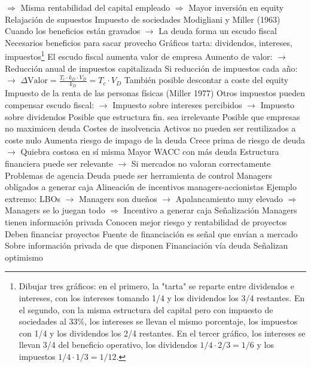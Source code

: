 \documentclass{nuevotema}
\begin{document}
\begin{esquemal}
				\4[] $\Rightarrow$ Misma rentabilidad del capital empleado
				\4[] $\Rightarrow$ Mayor inversión en equity
		\2 Relajación de supuestos
			\3 Impuesto de sociedades
				\4 Modigliani y Miller (1963)
				\4[] Cuando los beneficios están gravados
				\4[] $\to$ La deuda forma un escudo fiscal
				\4 Necesarios beneficios para sacar provecho
				\4 Gráficos tarta: dividendos, intereses, impuestos\footnote{Dibujar tres gráficos: en el primero, la "tarta" se reparte entre dividendos e intereses, con los intereses tomando 1/4 y los dividendos los 3/4 restantes. En el segundo, con la misma estructura del capital pero con impuesto de sociedades al 33\%, los intereses se llevan el mismo porcentaje, los impuestos con 1/4 y los dividendos los 2/4 restantes. En el tercer gráfico, los intereses se llevan 3/4 del beneficio operativo, los dividendos $1/4\cdot2/3=1/6$ y los impuestos $1/4\cdot 1/3=1/12$.}
				\4 El escudo fiscal aumenta valor de empresa
				\4[] Aumento de valor:
				\4[] $\to$ Reducción anual de impuestos capitalizada
				\4[] Si reducción de impuestos cada año:
				\4[] $\to$ $\Delta \text{Valor} = \frac{T_c \cdot k_D \cdot V_D}{k_D} = T_c \cdot V_D$
				\4[] También posible descontar a coste del equity
			\3 Impuesto de la renta de las personas físicas (Miller 1977)
				\4 Otros impuestos pueden compensar escudo fiscal:
				\4[] $\to$ Impuesto sobre intereses percibidos
				\4[] $\to$ Impuesto sobre dividendos
				\4[$\then$] Posible que estructura fin. sea irrelevante
				\4[$\then$] Posible que empresas no maximicen deuda
			\3 Costes de insolvencia
				\4 Activos no pueden ser reutilizados a coste nulo
				\4[] Aumenta riesgo de impago de la deuda
				\4[] Crece prima de riesgo de deuda
				\4[] $\to$  Quiebra costosa en sí misma
				\4[$\then$] Mayor WACC con más deuda
				\4[$\then$] Estructura financiera puede ser relevante
				\4[] $\to$ Si mercados no valoran correctamente
			\3 Problemas de agencia
				\4 Deuda puede ser herramienta de control
				\4[] Managers obligados a generar caja
				\4[] Alineación de incentivos managers-accionistas
				\4 Ejemplo extremo: LBOs
				\4[] $\to$ Managers son dueños
				\4[] $\to$ Apalancamiento muy elevado
				\4[] $\Rightarrow$ Managers se lo juegan todo
				\4[] $\Rightarrow$ Incentivo a generar caja
			\3 Señalización
				\4 Managers tienen información privada
				\4[] Conocen mejor riesgo y rentabilidad de proyectos
				\4 Deben financiar proyectos
				\4 Fuente de financiación es señal que envían a mercado
				\4[] Sobre información privada de que disponen
				\4 Financiación vía deuda
				\4[] Señalizan optimismo

\end{esquemal}
\end{document}
